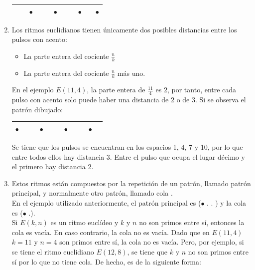 \documentclass[a4paper, openright, 11pt, titlepage]{report}
\theoremstyle{definition}\newtheorem{defin}[propo]{Definition}
\theoremstyle{definition}\newtheorem{obser}[propo]{Remark}
\theoremstyle{definition}\newtheorem{ejem}[propo]{Ejemplo}
\theoremstyle{definition}\newtheorem{algoritmo}[propo]{Algoritmo}
\begin{document}
\begin{enumerate}
    \begin{table}[H]
        \centering
        \begin{tabular}{|c|c|c|c|c|c|c|c|c|c|c|}
        \hline
            & & $\bullet$ & & & $\bullet$ & & &$\bullet$ & &$\bullet$ \\
            \hline
        \end{tabular}
        \end{table}
    \item Los ritmos euclidianos tienen únicamente dos posibles distancias entre los pulsos con acento:
    \begin{itemize}
        \item La parte entera del cociente $\frac{n}{k}$
        \item La parte entera del cociente $\frac{n}{k}$ más uno.
    \end{itemize}
    En el ejemplo $E(11,4)$, la parte entera de $\frac{11}{4}$ es $2$, por tanto, entre cada pulso con acento solo puede haber una distancia de $2$ o de $3$. Si se observa el patrón dibujado:
    \begin{table}[H]
        \centering
        \begin{tabular}{|c|c|c|c|c|c|c|c|c|c|c|}
        \hline
            $\bullet$ & & & $\bullet$ & & & $\bullet$ & & &$\bullet$ &\\
            \hline
        \end{tabular}
    \end{table}
    Se tiene que los pulsos se encuentran en los espacios 1, 4, 7 y 10, por lo que entre todos ellos hay distancia 3. Entre el pulso que ocupa el lugar décimo y el primero hay distancia 2.
    \item Estos ritmos están compuestos por la repetición de un patrón, llamado patrón principal, y normalmente otro patrón, llamado cola \cite{ritmos}.\\
    En el ejemplo utilizado anteriormente, el patrón principal es ($\bullet$\hspace{0.1cm} .\hspace{0.1cm} . \hspace{0.1cm}) y la cola es ($\bullet$ \hspace{0.1cm}.\hspace{0.1cm}).\\
    Si $E(k, n)$ es un ritmo euclídeo y $k$ y $n$ no son primos entre sí, entonces la cola es vacía. En caso contrario, la cola no es vacía. Dado que en $E(11,4)$ $k = 11$ y $n = 4$ son primos entre sí, la cola no es vacía. Pero, por ejemplo, si se tiene el ritmo euclidiano $E(12,8)$, se tiene que $k$ y $n$ no son primos entre sí por lo que no tiene cola. De hecho, es de la siguiente forma:

\end{enumerate}
\end{document}
